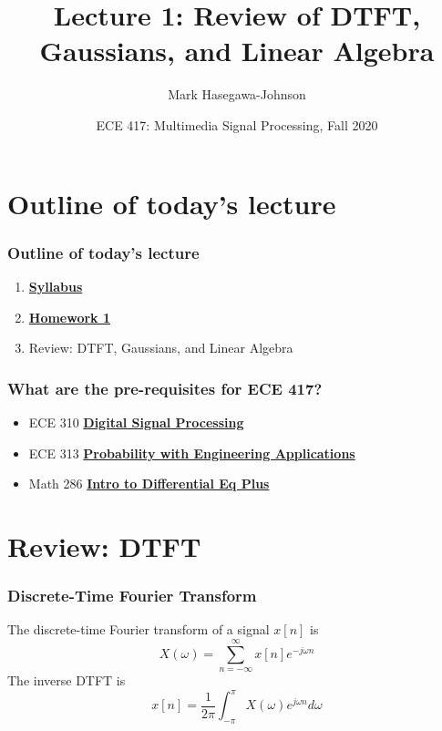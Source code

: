 \documentclass{beamer}
\title{Lecture 1: Review of DTFT, Gaussians, and Linear Algebra}
\author{Mark Hasegawa-Johnson}
\date{ECE 417: Multimedia Signal Processing, Fall 2020}
\begin{document}
\begin{frame}
  \maketitle
\end{frame}

\begin{frame}
  \tableofcontents
\end{frame}

\section[Outline]{Outline of today's lecture}
\setcounter{subsection}{1}
\begin{frame}
  \frametitle{Outline of today's lecture}
  \begin{enumerate}
  \item \href{https://courses.engr.illinois.edu/ece417/fa2020/\#syllabus}{\bf\color{blue}Syllabus}
  \item \href{https://courses.engr.illinois.edu/ece417/fa2020/hw1.pdf}{\bf\color{blue}Homework 1}
  \item Review: DTFT, Gaussians, and Linear Algebra
  \end{enumerate}
\end{frame}

\begin{frame}
  \frametitle{What are the pre-requisites for ECE 417?}
  \begin{itemize}
  \item ECE 310 \href{https://courses.grainger.illinois.edu/ece310/fa2020/}{\bf\color{blue}Digital Signal Processing}
  \item ECE 313 \href{https://courses.grainger.illinois.edu/ece313/fa2020/}{\bf\color{blue}Probability with Engineering Applications}
  \item Math 286 \href{https://netmath.illinois.edu/college/math-286}{\bf\color{blue}Intro to Differential Eq Plus}
  \end{itemize}
\end{frame}

\section[DTFT]{Review: DTFT}
\setcounter{subsection}{1}

\begin{frame}
  \frametitle{Discrete-Time Fourier Transform}
  The discrete-time Fourier transform of a signal $x[n]$ is
  \[
  X(\omega) = \sum_{n=-\infty}^\infty x[n]e^{-j\omega n}
  \]
  The inverse DTFT is
  \[
  x[n] = \frac{1}{2\pi}\int_{-\pi}^\pi X(\omega)e^{j\omega n}d\omega
  \]
\end{frame}
\end{document}
